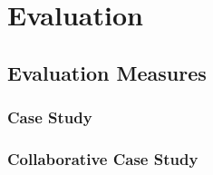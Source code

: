 
\chapter{Evaluation}
\label{Evaluation}


\section{Evaluation Measures}

\subsection{Case Study}




\subsection{Collaborative Case Study}

